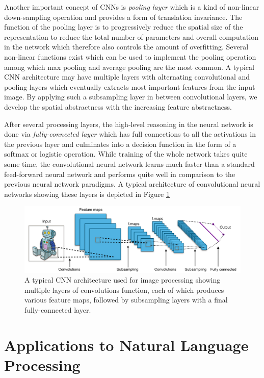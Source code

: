 Another important concept of CNNs is {\it pooling layer} which is a kind of non-linear down-sampling operation and provides a form of translation invariance. The function of the pooling layer is to progressively reduce the spatial size of the representation to reduce the total number of parameters and overall computation in the network which therefore also controls the amount of overfitting. Several non-linear functions exist which can be used to implement the pooling operation among which max pooling and average pooling are the most common. A typical CNN architecture may have multiple layers with alternating convolutional and pooling layers which eventually extracts most important features from the input image. By applying such a subsampling layer in between convolutional layers, we develop the spatial abstractness with the increasing feature abstractness. 

After several processing layers, the high-level reasoning in the neural network is done via {\it fully-connected layer} which has full connections to all the activations in the previous layer and culminates into a decision function in the form of a softmax or logistic operation. While training of the whole network takes quite some time, the convolutional neural network learns much faster than a standard feed-forward neural network and performs quite well in comparison to the previous neural network paradigms. A typical architecture of convolutional neural networks showing these layers is depicted in Figure \ref{figure:typical-cnn-architecture}

\begin{figure}[ht]
    \centering
    \includegraphics[width=0.85\linewidth]{Images/Typical-CNN-Architecture.png}
    \caption{A typical CNN architecture used for image processing showing multiple layers of convolutions function, each of which produces various feature maps, followed by subsampling layers with a final fully-connected layer.}
    \label{figure:typical-cnn-architecture}
    \vspace{0.2in}
\end{figure}

\section{Applications to Natural Language Processing}
\label{section:application-to-nlp}

